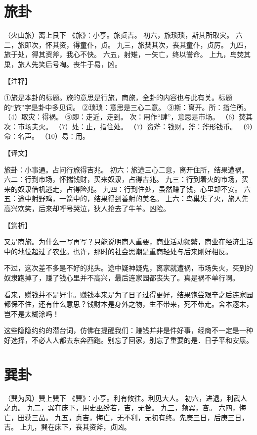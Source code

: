 \documentclass[12pt,UTF8]{ctexbook}
\begin{document}
\chapter{旅卦}

（火山旅）离上艮下
《旅》：小亨。旅贞吉。
初六，旅琐琐，斯其所取灾。
六二，旅即次，怀其资，得童仆，贞。
九三，旅焚其次，丧其童仆，贞厉。
九四，旅于处，得其资斧，我心不快。
六五，射雉，一矢亡，终以誉命。
上九，鸟焚其巢，旅人先笑后号啕。丧牛于易，凶。

【注释】

①旅是本卦的标题。旅的意思是行旅，商旅，全卦的内容也与此有关。标题的“旅”字是卦中多见词。
②琐琐：意思是三心二意。
③斯：离开。所：指住所。
（4）取灾：得祸。
⑤即：走近，走到。 次：用作“肆”，意思是市场。
（6）焚其次：市场夫火。
（7）处：止，指住处。
（7）资斧：钱财。斧：斧形钱币。
（9）命：名声。
（10）易：用。

【译文】

旅卦：小事通。占问行旅得吉兆。
初六：旅途三心二意，离开住所，结果遭祸。
六二：行到市场，怀揣钱财，买来奴隶，占得吉兆。
九三：行到着火的市场，买来的奴隶借机逃走，占得险兆。
九四：行到住处，虽然赚了钱，心里却不安。
六五：途中射野鸡，一箭中的，结果得到善射的美名。
上六：鸟巢失了火，旅人先高兴欢笑，后来却呼号哭泣，狄人抢去了牛羊。凶险。

【赏析】

又是商旅。为什么一写再写？只能说明商人重要，商业活动频繁，商业在经济生活中的地位超过了农业。也许，那时的社会思潮是重商轻处与后来刚好相反。

不过，这次差不多是不好的兆头。途中疑神疑鬼，离家就遭祸，市场失火，买到的奴隶跑掉了，赚了钱心里并不高兴，最后连家园都丧失了。真是祸不单行啊。

看来，赚钱并不是好事。赚钱本来是为了日子过得更好，结果饱尝艰辛之后连家园都保不住，还有什么意思？钱财本是身外之物，生不带来，死不带走。舍本逐末，岂不是太糊涂吗！

这些隐隐约约的潜台词，仿佛在提醒我们：赚钱并非是件好事，经商不一定是一种好选择，不必人人都去东奔西跑。别忘了回家，别忘了重要的是．日子平和安康。

\chapter{巽卦}

（巽为风）巽上巽下
《巽》：小亨。利有攸往。利见大人。
初六，进退，利武人之贞。
九二，巽在床下，用史巫纷若，吉，无咎。
九三，频巽，吝。
六四，悔亡，田获三品。
九五，贞吉，悔亡，无不利，无初有终。先庚三日，后庚三日，吉。
上九，巽在床下，丧其资斧，贞凶。
\end{document}

